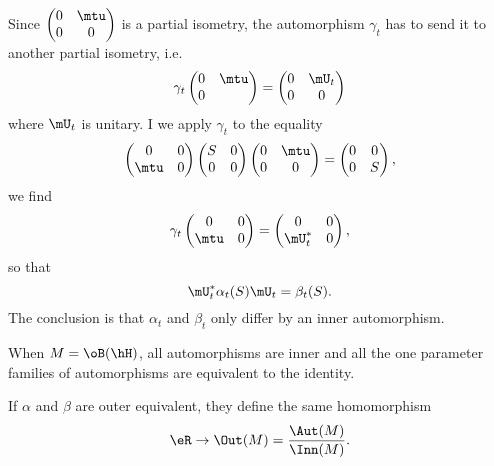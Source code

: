 Since $
	\begin{pmatrix}
		0 & \mtu \\
		0 & 0
	\end{pmatrix}
$ is a partial isometry, the automorphism $\gamma_t$ has to send it to another partial isometry, i.e.
\begin{equation}
	\gamma_t
	\begin{pmatrix}
		0 & \mtu \\
		0 &
	\end{pmatrix}
	=
	\begin{pmatrix}
		0 & \mU_t \\
		0 & 0
	\end{pmatrix}
\end{equation}
where $\mU_t$ is unitary. I we apply $\gamma_t$ to the equality
\begin{equation}
	\begin{pmatrix}
		0    & 0 \\
		\mtu & 0
	\end{pmatrix}
	\begin{pmatrix}
		S & 0 \\
		0 & 0
	\end{pmatrix}
	\begin{pmatrix}
		0 & \mtu \\
		0 & 0
	\end{pmatrix}
	=
	\begin{pmatrix}
		0 & 0 \\
		0 & S
	\end{pmatrix},
\end{equation}
we find
\begin{equation}
	\gamma_t
	\begin{pmatrix}
		0    & 0 \\
		\mtu & 0
	\end{pmatrix}
	=
	\begin{pmatrix}
		0       & 0 \\
		\mU_t^* & 0
	\end{pmatrix},
\end{equation}
so that
\begin{equation}
	\mU_t^*\alpha_t(S)\mU_t=\beta_t(S).
\end{equation}
The conclusion is that $\alpha_t$ and $\beta_t$ only differ by an inner automorphism.

When $M=\oB(\hH)$, all automorphisms are inner and all the one parameter families of automorphisms are equivalent to the identity.

If $\alpha$ and $\beta$ are outer equivalent, they define the same homomorphism
\begin{equation}
	\eR\to\Out(M)=\frac{ \Aut(M) }{ \Inn(M) }.
\end{equation}

